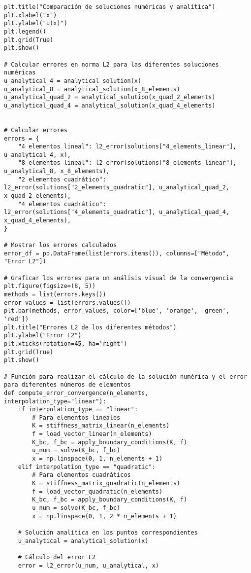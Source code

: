 \begin{verbatim}
plt.title("Comparación de soluciones numéricas y analítica")
plt.xlabel("x")
plt.ylabel("u(x)")
plt.legend()
plt.grid(True)
plt.show()

# Calcular errores en norma L2 para las diferentes soluciones numéricas
u_analytical_4 = analytical_solution(x)
u_analytical_8 = analytical_solution(x_8_elements)
u_analytical_quad_2 = analytical_solution(x_quad_2_elements)
u_analytical_quad_4 = analytical_solution(x_quad_4_elements)


# Calcular errores
errors = {
    "4 elementos lineal": l2_error(solutions["4_elements_linear"], u_analytical_4, x),
    "8 elementos lineal": l2_error(solutions["8_elements_linear"], u_analytical_8, x_8_elements),
    "2 elementos cuadrático": l2_error(solutions["2_elements_quadratic"], u_analytical_quad_2, x_quad_2_elements),
    "4 elementos cuadrático": l2_error(solutions["4_elements_quadratic"], u_analytical_quad_4, x_quad_4_elements),
}

# Mostrar los errores calculados
error_df = pd.DataFrame(list(errors.items()), columns=["Método", "Error L2"])

# Graficar los errores para un análisis visual de la convergencia
plt.figure(figsize=(8, 5))
methods = list(errors.keys())
error_values = list(errors.values())
plt.bar(methods, error_values, color=['blue', 'orange', 'green', 'red'])
plt.title("Errores L2 de los diferentes métodos")
plt.ylabel("Error L2")
plt.xticks(rotation=45, ha='right')
plt.grid(True)
plt.show()

# Función para realizar el cálculo de la solución numérica y el error para diferentes números de elementos
def compute_error_convergence(n_elements, interpolation_type="linear"):
    if interpolation_type == "linear":
        # Para elementos lineales
        K = stiffness_matrix_linear(n_elements)
        f = load_vector_linear(n_elements)
        K_bc, f_bc = apply_boundary_conditions(K, f)
        u_num = solve(K_bc, f_bc)
        x = np.linspace(0, 1, n_elements + 1)
    elif interpolation_type == "quadratic":
        # Para elementos cuadráticos
        K = stiffness_matrix_quadratic(n_elements)
        f = load_vector_quadratic(n_elements)
        K_bc, f_bc = apply_boundary_conditions(K, f)
        u_num = solve(K_bc, f_bc)
        x = np.linspace(0, 1, 2 * n_elements + 1)
    
    # Solución analítica en los puntos correspondientes
    u_analytical = analytical_solution(x)
    
    # Cálculo del error L2
    error = l2_error(u_num, u_analytical, x)
    

\end{verbatim}
